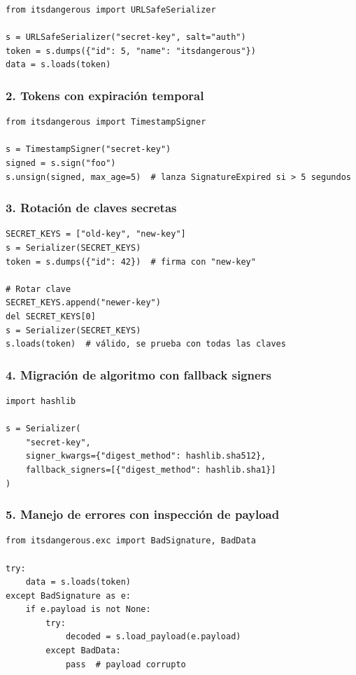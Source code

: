 \documentclass[11pt,a4paper]{article}
\begin{document}
\begin{lstlisting}
from itsdangerous import URLSafeSerializer

s = URLSafeSerializer("secret-key", salt="auth")
token = s.dumps({"id": 5, "name": "itsdangerous"})
data = s.loads(token)
\end{lstlisting}


\subsubsection*{2. Tokens con expiración temporal}


\begin{lstlisting}
from itsdangerous import TimestampSigner

s = TimestampSigner("secret-key")
signed = s.sign("foo")
s.unsign(signed, max_age=5)  # lanza SignatureExpired si > 5 segundos
\end{lstlisting}


\subsubsection*{3. Rotación de claves secretas}


\begin{lstlisting}
SECRET_KEYS = ["old-key", "new-key"]
s = Serializer(SECRET_KEYS)
token = s.dumps({"id": 42})  # firma con "new-key"

# Rotar clave
SECRET_KEYS.append("newer-key")
del SECRET_KEYS[0]
s = Serializer(SECRET_KEYS)
s.loads(token)  # válido, se prueba con todas las claves
\end{lstlisting}


\subsubsection*{4. Migración de algoritmo con fallback signers}


\begin{lstlisting}
import hashlib

s = Serializer(
    "secret-key",
    signer_kwargs={"digest_method": hashlib.sha512},
    fallback_signers=[{"digest_method": hashlib.sha1}]
)
\end{lstlisting}


\subsubsection*{5. Manejo de errores con inspección de payload}


\begin{lstlisting}
from itsdangerous.exc import BadSignature, BadData

try:
    data = s.loads(token)
except BadSignature as e:
    if e.payload is not None:
        try:
            decoded = s.load_payload(e.payload)
        except BadData:
            pass  # payload corrupto
\end{lstlisting}
\end{document}
